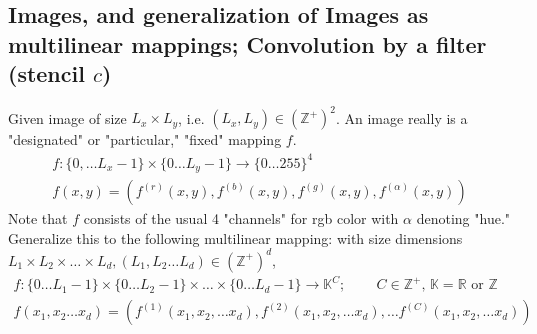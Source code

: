 \documentclass[10pt]{amsart}
\begin{document}
\begin{multicols*}{2}
\section{Images, and generalization of Images as multilinear mappings; Convolution by a filter (stencil $c$)}
Given image of size $L_x \times L_y$, i.e. $(L_x,L_y)\in ( \mathbb{Z}^+)^2$.  An image really is a "designated" or "particular," "fixed" mapping $f$.  
\[
\begin{gathered}
f: \lbrace 0 , \dots L_x- 1\rbrace \times \lbrace 0 \dots L_y-1 \rbrace \to \lbrace 0 \dots 255 \rbrace^4 \\ 
f(x,y) = (f^{(r)}(x,y), f^{(b)}(x,y), f^{(g)}(x,y), f^{(\alpha)}(x,y))
\end{gathered}
\]
Note that $f$ consists of the usual 4 "channels" for rgb color with $\alpha$ denoting "hue."  
Generalize this to the following multilinear mapping:  
with size dimensions $L_1 \times L_2 \times \dots \times L_d, (L_1, L_2 \dots L_d)\in (\mathbb{Z}^+)^d$, 
\begin{equation}
\begin{gathered}
f: \lbrace 0 \dots L_1 - 1 \rbrace \times  \lbrace 0 \dots L_2 - 1 \rbrace \times \dots \times  \lbrace 0 \dots L_d - 1 \rbrace \to \mathbb{K}^C ; \qquad \, C\in \mathbb{Z}^+ , \, \mathbb{K} = \mathbb{R} \text{ or } \mathbb{Z} \\ 
f(x_1,x_2 \dots x_d) = (f^{(1)}(x_1,x_2,\dots x_d), f^{(2)}(x_1,x_2,\dots x_d), \dots f^{(C)}(x_1,x_2,\dots x_d) )
\end{gathered}
\end{equation}

\end{multicols*}
\end{document}
